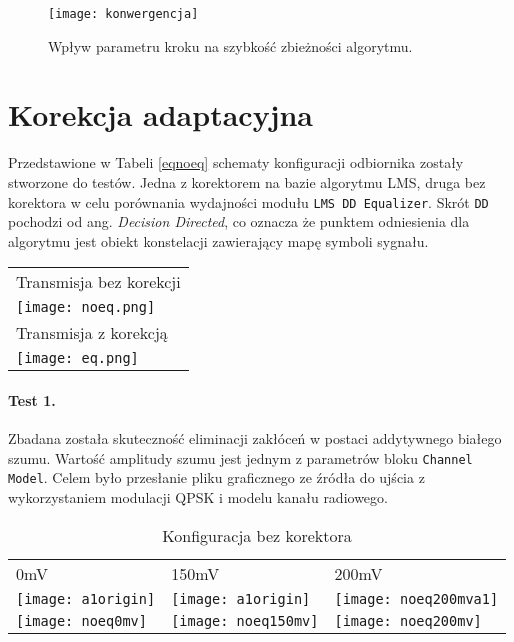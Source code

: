 \begin{figure}[ht]
\centering
\texttt{[image: konwergencja]}
\caption{Wpływ parametru kroku na szybkość zbieżności algorytmu.}
\label{fig:sine4}
\end{figure}

\section{Korekcja adaptacyjna}

Przedstawione w Tabeli \ref{eqnoeq} schematy konfiguracji odbiornika zostały stworzone do testów.
Jedna z korektorem na bazie algorytmu LMS, druga bez korektora w celu porównania wydajności modułu \texttt{LMS DD Equalizer}. 
Skrót \texttt{DD} pochodzi od ang. \textit{Decision Directed}, co oznacza że punktem odniesienia dla algorytmu jest obiekt konstelacji zawierający mapę symboli sygnału. \cite{dd_lms_eq}

\begin{sidewaystable}[t]
\centering
\caption{Diagramy konfiguracji odbiornika}
\label{eqnoeq}
\begin{tabular}{l}
\hline
Transmisja bez korekcji \\
\texttt{[image: noeq.png]}\\ \hline
Transmisja z korekcją   \\
\texttt{[image: eq.png]}\\
\end{tabular}
\end{sidewaystable}

\paragraph{Test 1.}
Zbadana została skuteczność eliminacji zakłóceń w postaci addytywnego białego szumu.
Wartość amplitudy szumu jest jednym z parametrów bloku \texttt{Channel Model}.
Celem było przesłanie pliku graficznego ze źródła do ujścia z wykorzystaniem modulacji QPSK i modelu kanału radiowego.


\begin{table}[ht]
\centering
\caption{Konfiguracja bez korektora}
\label{tab:noeq}
\begin{tabular}{|l|l|l|}
\hline
0mV      & 150mV    & 200mV    \\
\texttt{[image: a1origin]} & \texttt{[image: a1origin]} & \texttt{[image: noeq200mva1]} \\
\texttt{[image: noeq0mv]}   & \texttt{[image: noeq150mv]}   & \texttt{[image: noeq200mv]}  \\ \hline
\end{tabular}
\end{table}

